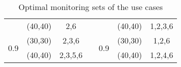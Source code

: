 \begin{table}[]
{\begin{tabular}{ccccccc}
\multicolumn{1}{|c|}{} & \multicolumn{1}{c|}{(40,40)} & \multicolumn{1}{c|}{2,6} & \multicolumn{1}{c|}{} & \multicolumn{1}{c|}{} & \multicolumn{1}{c|}{(40,40)} & \multicolumn{1}{c|}{1,2,3,6} \\ \cline{1-3}
\multicolumn{1}{|c|}{\multirow{2}{*}{0.9}} & \multicolumn{1}{c|}{(30,30)} & \multicolumn{1}{c|}{2,3,6} & \multicolumn{1}{c|}{} & \multicolumn{1}{c|}{\multirow{2}{*}{0.9}} & \multicolumn{1}{c|}{(30,30)} & \multicolumn{1}{c|}{1,2,6} \\ \cline{2-3}
\multicolumn{1}{|c|}{} & \multicolumn{1}{c|}{(40,40)} & \multicolumn{1}{c|}{2,3,5,6} & \multicolumn{1}{c|}{} & \multicolumn{1}{c|}{} & \multicolumn{1}{c|}{(40,40)} & \multicolumn{1}{c|}{1,2,4,6} \\ \cline{2-3}
\end{tabular}%
}
\caption{Optimal monitoring sets of the use cases}
\label{tab:mdp-usecase-optiset}
\end{table}